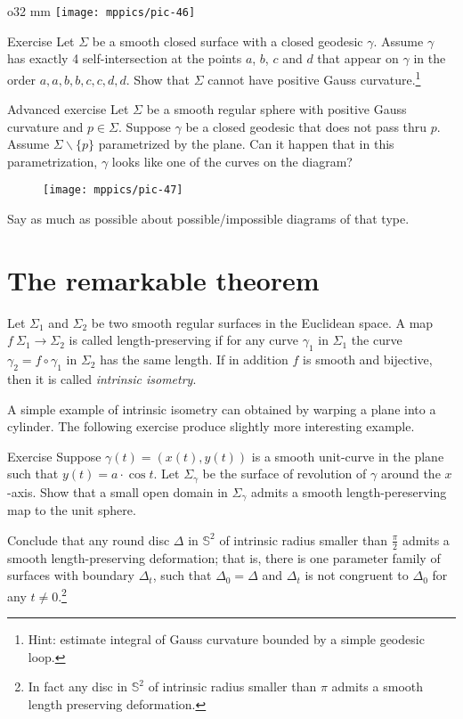{

\begin{wrapfigure}{o}{32 mm}
\vskip-0mm
\centering
\texttt{[image: mppics/pic-46]}
\vskip-0mm
\end{wrapfigure}

\begin{thm}{Exercise}
Let $\Sigma$ be a smooth closed surface with a closed geodesic $\gamma$.
Assume $\gamma$ has exactly 4 self-intersection at the points $a$, $b$, $c$ and $d$ that appear on $\gamma$ in the order $a,a,b,b,c,c,d,d$.
Show that $\Sigma$ cannot have positive Gauss curvature.\footnote{Hint: estimate integral of Gauss curvature bounded by a simple geodesic loop.}
\end{thm}

\begin{thm}{Advanced exercise}
Let $\Sigma$ be a smooth regular sphere with positive Gauss curvature and $p\in\Sigma$. 
Suppose $\gamma$ be a closed geodesic that does not pass thru $p$.
Assume $\Sigma\backslash\{p\}$ parametrized by the plane.
Can it happen that in this parametrization,  $\gamma$ looks like one of the curves on the diagram?
\begin{figure}[h!]
\vskip-0mm
\centering
\texttt{[image: mppics/pic-47]}
\vskip-0mm
\end{figure}
Say as much as possible about possible/impossible diagrams of that type.
\end{thm}

}

\section{The remarkable theorem}

Let $\Sigma_1$ and $\Sigma_2$ be two smooth regular surfaces in the Euclidean space.
A map $f\:\Sigma_1\to \Sigma_2$ is called  length-preserving if for any curve $\gamma_1$ in $\Sigma_1$ the curve $\gamma_2=f\circ\gamma_1$ in $\Sigma_2$ has the same length. %
If in addition $f$ is smooth and bijective, then it is called \emph{intrinsic isometry}. 

A simple example of intrinsic isometry can obtained by warping a plane into a cylinder.
The following exercise produce slightly more interesting example.

\begin{thm}{Exercise}
Suppose $\gamma(t)=(x(t),y(t))$ is a smooth unit-curve in the plane such that $y(t)=a\cdot \cos t$.
Let $\Sigma_\gamma$ be the surface of revolution of $\gamma$ around the $x$-axis.
Show that a small open domain in $\Sigma_\gamma$ admits a smooth length-pereserving map to the unit sphere.

Conclude that any round disc $\Delta$ in $\mathbb{S}^2$ of intrinsic radius smaller than $\tfrac\pi2$ admits a smooth length-preserving deformation; that is, there is one parameter family of surfaces with boundary $\Delta_t$, such that $\Delta_0=\Delta$ and $\Delta_t$ is not congruent to $\Delta_0$ for any $t\ne0$.\footnote{In fact any disc in $\mathbb{S}^2$ of intrinsic radius smaller than $\pi$ admits a smooth length preserving deformation. %
}
\end{thm}


